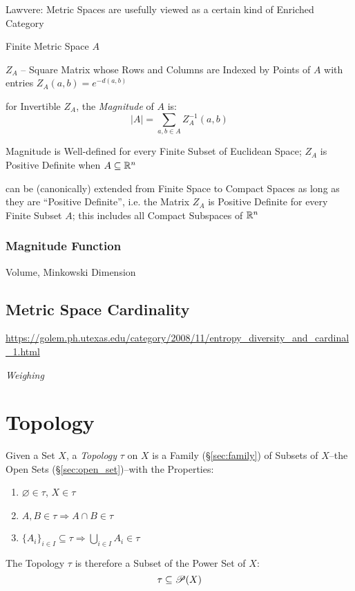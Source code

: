 Lawvere: Metric Spaces are usefully viewed as a certain kind of
Enriched Category

Finite Metric Space $A$

$Z_A$ -- Square Matrix whose Rows and Columns are Indexed by Points of
$A$ with entries $Z_A(a,b) = e^{-d(a,b)}$

for Invertible $Z_A$, the \emph{Magnitude} of $A$ is:
\[
  |A| = \sum_{a,b \in A} Z^{-1}_A (a,b)
\]

Magnitude is Well-defined for every Finite Subset of Euclidean Space;
$Z_A$ is Positive Definite when $A \subseteq \mathbb{R}^n$

can be (canonically) extended from Finite Space to Compact Spaces as
long as they are ``Positive Definite'', i.e. the Matrix $Z_A$ is
Positive Definite for every Finite Subset $A$; this includes all
Compact Subspaces of $\mathbb{R}^n$



\subsubsection{Magnitude Function}\label{sec:magnitude_function}

Volume, Minkowski Dimension



\subsection{Metric Space Cardinality}\label{sec:metric_cardinality}

\url{https://golem.ph.utexas.edu/category/2008/11/entropy_diversity_and_cardinal_1.html}

\emph{Weighing}



\section{Topology}\label{sec:topology}

Given a Set $X$, a \emph{Topology} $\tau$ on $X$ is a Family
(\S\ref{sec:family}) of Subsets of $X$--the Open Sets
(\S\ref{sec:open_set})--with the Properties:
\begin{enumerate}
  \item $\varnothing \in \tau$, $X \in \tau$
  \item $A,B \in \tau \Rightarrow A \cap B \in \tau$
  \item $\{A_i\}_{i \in I} \subseteq \tau \Rightarrow \bigcup_{i \in
  I} A_i \in \tau$
\end{enumerate}
The Topology $\tau$ is therefore a Subset of the Power Set of $X$:
\[
  \tau \subseteq \mathscr{P}(X)
\]

